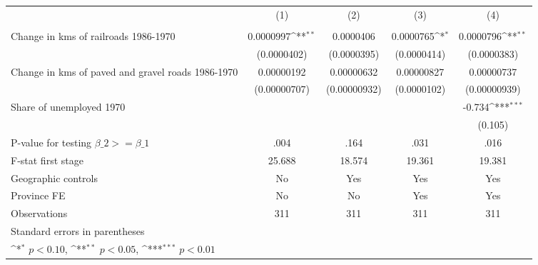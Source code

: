 {
\def\sym#1{\ifmmode^{#1}\else\(^{#1}\)\fi}
\begin{tabular}{l*{4}{c}}
\hline\hline
                &\multicolumn{1}{c}{(1)}&\multicolumn{1}{c}{(2)}&\multicolumn{1}{c}{(3)}&\multicolumn{1}{c}{(4)}\\
                &\multicolumn{1}{c}{}&\multicolumn{1}{c}{}&\multicolumn{1}{c}{}&\multicolumn{1}{c}{}\\
\hline
Change in kms of railroads 1986-1970&0.0000997\sym{**} &0.0000406         &0.0000765\sym{*}  &0.0000796\sym{**} \\
                &(0.0000402)         &(0.0000395)         &(0.0000414)         &(0.0000383)         \\
[1em]
Change in kms of paved and gravel roads 1986-1970&0.00000192         &0.00000632         &0.00000827         &0.00000737         \\
                &(0.00000707)         &(0.00000932)         &(0.0000102)         &(0.00000939)         \\
[1em]
Share of unemployed 1970&                  &                  &                  &   -0.734\sym{***}\\
                &                  &                  &                  &  (0.105)         \\
\hline
P-value for testing $\beta\_{2} >= \beta\_{1}$&     .004         &     .164         &     .031         &     .016         \\
F-stat first stage&   25.688         &   18.574         &   19.361         &   19.381         \\
Geographic controls&       No         &      Yes         &      Yes         &      Yes         \\
Province FE     &       No         &       No         &      Yes         &      Yes         \\
Observations    &      311         &      311         &      311         &      311         \\
\hline\hline
\multicolumn{5}{l}{\footnotesize Standard errors in parentheses}\\
\multicolumn{5}{l}{\footnotesize \sym{*} \(p<0.10\), \sym{**} \(p<0.05\), \sym{***} \(p<0.01\)}\\
\end{tabular}
}
